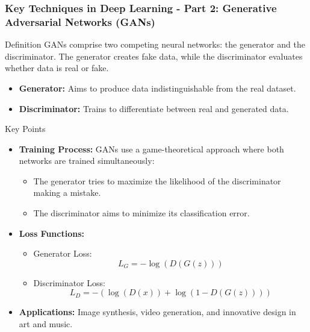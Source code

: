 \documentclass[aspectratio=169]{beamer}
\begin{document}
\begin{frame}[fragile]
    \frametitle{Key Techniques in Deep Learning - Part 2: Generative Adversarial Networks (GANs)}
    \begin{block}{Definition}
        GANs comprise two competing neural networks: the generator and the discriminator. The generator creates fake data, while the discriminator evaluates whether data is real or fake.
    \end{block}

    \begin{itemize}
        \item \textbf{Generator:} Aims to produce data indistinguishable from the real dataset.
        \item \textbf{Discriminator:} Trains to differentiate between real and generated data.
    \end{itemize}

    \begin{block}{Key Points}
        \begin{itemize}
            \item \textbf{Training Process:} GANs use a game-theoretical approach where both networks are trained simultaneously:
            \begin{itemize}
                \item The generator tries to maximize the likelihood of the discriminator making a mistake.
                \item The discriminator aims to minimize its classification error.
            \end{itemize}
            \item \textbf{Loss Functions:}
            \begin{itemize}
                \item Generator Loss: 
                \begin{equation}
                    L_G = -\log(D(G(z)))
                \end{equation}
                \item Discriminator Loss: 
                \begin{equation}
                    L_D = -(\log(D(x)) + \log(1 - D(G(z))))
                \end{equation}
            \end{itemize}
            \item \textbf{Applications:} Image synthesis, video generation, and innovative design in art and music.
        \end{itemize}
    \end{block} 
\end{frame}
\end{document}
